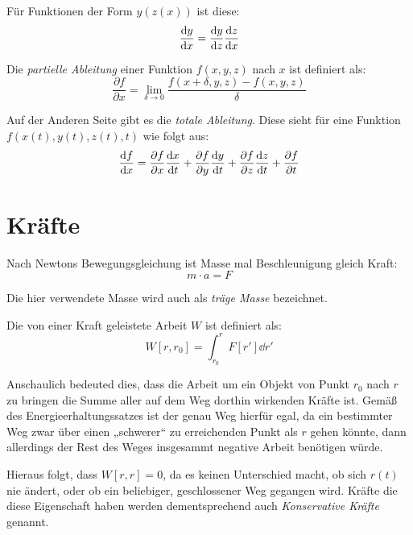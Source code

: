 Für Funktionen der Form $y(z(x))$ ist diese:
\begin{equation}
 \frac{\mathrm{d} y}{\mathrm{d}x} = \frac{\mathrm{d} y}{\mathrm{d} z} \frac{\mathrm{d} z}{\mathrm{d}x}
\end{equation}


Die \emph{partielle Ableitung} einer Funktion $f(x, y, z)$ nach $x$ ist definiert als:
\begin{equation}
 \frac{\partial f}{\partial x} = \lim_{\delta \rightarrow 0} \frac{f(x + \delta, y, z) - f(x, y, z)}{\delta}
\end{equation}

Auf der Anderen Seite gibt es die \emph{totale Ableitung}. Diese sieht für eine Funktion $f(x(t), y(t), z(t), t)$ wie folgt aus:
\begin{equation}
\frac{\mathrm{d} f}{\mathrm{d}x} = 
  \frac{\partial f}{\partial x} \frac{\mathrm{d} x}{\mathrm{d}t} + 
  \frac{\partial f}{\partial y} \frac{\mathrm{d} y}{\mathrm{d}t} +
  \frac{\partial f}{\partial z} \frac{\mathrm{d} z}{\mathrm{d}t} + 
  \frac{\partial f}{\partial t}
\end{equation}

\section{Kräfte}

Nach Newtons Bewegungsgleichung ist Masse mal Beschleunigung gleich Kraft:
\begin{equation}
 m \cdot a = F
\end{equation}

Die hier verwendete Masse wird auch als \emph{träge Masse} bezeichnet.

Die von einer Kraft geleistete Arbeit $W$ ist definiert als:
\begin{equation}
 W[r, r_0] = \int^r_{r_0} F[r'] \dd r'
\end{equation}

Anschaulich bedeuted dies, dass die Arbeit um ein Objekt von Punkt $r_0$ nach $r$ zu bringen die Summe aller auf dem Weg dorthin wirkenden Kräfte ist. Gemäß des Energieerhaltungssatzes ist der genau Weg hierfür egal, da ein bestimmter Weg zwar über einen „schwerer“ zu erreichenden Punkt als $r$ gehen könnte, dann allerdings der Rest des Weges insgesammt negative Arbeit benötigen würde.

Hieraus folgt, dass $W[r, r] = 0$, da es keinen Unterschied macht, ob sich $r(t)$ nie ändert, oder ob ein beliebiger, geschlossener Weg gegangen wird. Kräfte die diese Eigenschaft haben werden dementsprechend auch \emph{Konservative Kräfte} genannt.